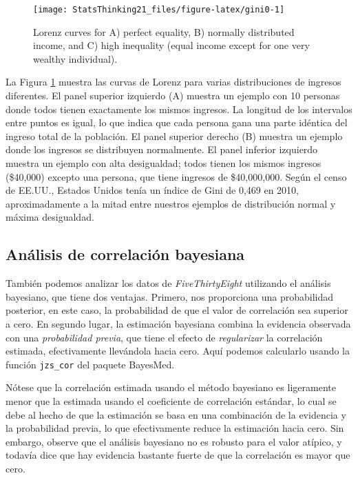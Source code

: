 \documentclass[
  12pt,
]{book}
\begin{document}
\begin{figure}
\texttt{[image: StatsThinking21\_files/figure-latex/gini0-1]} \caption{Lorenz curves for A) perfect equality, B) normally distributed income, and C) high inequality (equal income except for one very wealthy individual).}\label{fig:gini0}
\end{figure}

La Figura \ref{fig:gini0} muestra las curvas de Lorenz para varias distribuciones de ingresos diferentes. El panel superior izquierdo (A) muestra un ejemplo con 10 personas donde todos tienen exactamente los mismos ingresos. La longitud de los intervalos entre puntos es igual, lo que indica que cada persona gana una parte idéntica del ingreso total de la población. El panel superior derecho (B) muestra un ejemplo donde los ingresos se distribuyen normalmente. El panel inferior izquierdo muestra un ejemplo con alta desigualdad; todos tienen los mismos ingresos (\$40,000) excepto una persona, que tiene ingresos de \$40,000,000. Según el censo de EE.UU., Estados Unidos tenía un índice de Gini de 0,469 en 2010, aproximadamente a la mitad entre nuestros ejemplos de distribución normal y máxima desigualdad.

\hypertarget{anuxe1lisis-de-correlaciuxf3n-bayesiana}{%
\subsection{Análisis de correlación bayesiana}\label{anuxe1lisis-de-correlaciuxf3n-bayesiana}}

También podemos analizar los datos de \emph{FiveThirtyEight} utilizando el análisis bayesiano, que tiene dos ventajas. Primero, nos proporciona una probabilidad posterior, en este caso, la probabilidad de que el valor de correlación sea superior a cero. En segundo lugar, la estimación bayesiana combina la evidencia observada con una \emph{probabilidad previa}, que tiene el efecto de \emph{regularizar} la correlación estimada, efectivamente llevándola hacia cero. Aquí podemos calcularlo usando la función \texttt{jzs\_cor} del paquete BayesMed.

Nótese que la correlación estimada usando el método bayesiano es ligeramente menor que la estimada usando el coeficiente de correlación estándar, lo cual se debe al hecho de que la estimación se basa en una combinación de la evidencia y la probabilidad previa, lo que efectivamente reduce la estimación hacia cero. Sin embargo, observe que el análisis bayesiano no es robusto para el valor atípico, y todavía dice que hay evidencia bastante fuerte de que la correlación es mayor que cero.
\end{document}
